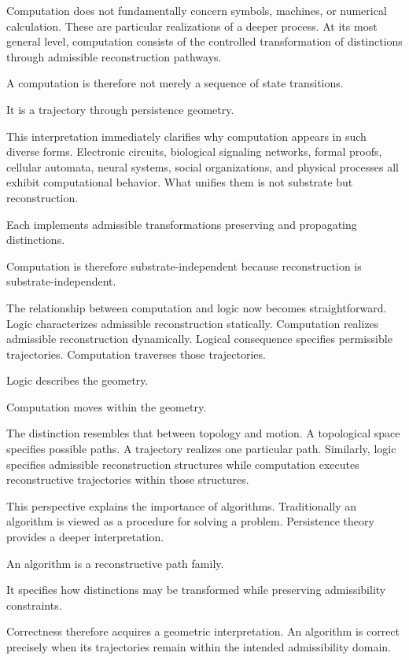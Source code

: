 \documentclass[12pt,oneside]{article}
\theoremstyle{definition}
\begin{document}
Computation does not fundamentally concern symbols, machines, or numerical calculation. These are particular realizations of a deeper process. At its most general level, computation consists of the controlled transformation of distinctions through admissible reconstruction pathways.

A computation is therefore not merely a sequence of state transitions.

It is a trajectory through persistence geometry.

This interpretation immediately clarifies why computation appears in such diverse forms. Electronic circuits, biological signaling networks, formal proofs, cellular automata, neural systems, social organizations, and physical processes all exhibit computational behavior. What unifies them is not substrate but reconstruction.

Each implements admissible transformations preserving and propagating distinctions.

Computation is therefore substrate-independent because reconstruction is substrate-independent.

The relationship between computation and logic now becomes straightforward. Logic characterizes admissible reconstruction statically. Computation realizes admissible reconstruction dynamically. Logical consequence specifies permissible trajectories. Computation traverses those trajectories.

Logic describes the geometry.

Computation moves within the geometry.

The distinction resembles that between topology and motion. A topological space specifies possible paths. A trajectory realizes one particular path. Similarly, logic specifies admissible reconstruction structures while computation executes reconstructive trajectories within those structures.

This perspective explains the importance of algorithms. Traditionally an algorithm is viewed as a procedure for solving a problem. Persistence theory provides a deeper interpretation.

An algorithm is a reconstructive path family.

It specifies how distinctions may be transformed while preserving admissibility constraints.

Correctness therefore acquires a geometric interpretation. An algorithm is correct precisely when its trajectories remain within the intended admissibility domain.
\end{document}
